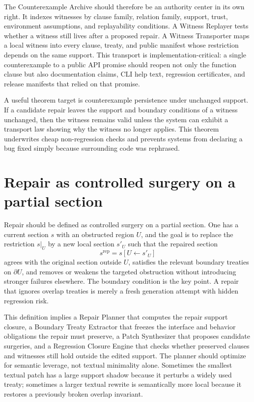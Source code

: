 \documentclass[11pt]{report}
\begin{document}
The Counterexample Archive should therefore be an authority center in its own right. It indexes witnesses by clause family, relation family, support, trust, environment assumptions, and replayability conditions. A Witness Replayer tests whether a witness still lives after a proposed repair. A Witness Transporter maps a local witness into every clause, treaty, and public manifest whose restriction depends on the same support. This transport is implementation-critical: a single counterexample to a public API promise should reopen not only the function clause but also documentation claims, CLI help text, regression certificates, and release manifests that relied on that promise.

A useful theorem target is counterexample persistence under unchanged support. If a candidate repair leaves the support and boundary conditions of a witness unchanged, then the witness remains valid unless the system can exhibit a transport law showing why the witness no longer applies. This theorem underwrites cheap non-regression checks and prevents systems from declaring a bug fixed simply because surrounding code was rephrased.
\section{Repair as controlled surgery on a partial section}
Repair should be defined as controlled surgery on a partial section. One has a current section $s$ with an obstructed region $U$, and the goal is to replace the restriction $s|_U$ by a new local section $s'_U$ such that the repaired section
\[
s^{\mathrm{rep}} = s[U \leftarrow s'_U]
\]
agrees with the original section outside $U$, satisfies the relevant boundary treaties on $\partial U$, and removes or weakens the targeted obstruction without introducing stronger failures elsewhere. The boundary condition is the key point. A repair that ignores overlap treaties is merely a fresh generation attempt with hidden regression risk.

This definition implies a Repair Planner that computes the repair support closure, a Boundary Treaty Extractor that freezes the interface and behavior obligations the repair must preserve, a Patch Synthesizer that proposes candidate surgeries, and a Regression Closure Engine that checks whether preserved clauses and witnesses still hold outside the edited support. The planner should optimize for semantic leverage, not textual minimality alone. Sometimes the smallest textual patch has a large support shadow because it perturbs a widely used treaty; sometimes a larger textual rewrite is semantically more local because it restores a previously broken overlap invariant.
\end{document}
